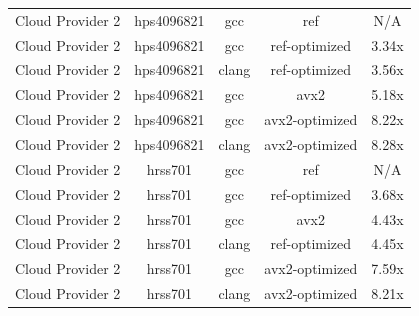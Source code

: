 \begin{table}
\begin{tabularx}{\linewidth}{X c c c c}
            Cloud Provider 2 &           hps4096821 &                  gcc &                  ref &                  N/A\\
            Cloud Provider 2 &           hps4096821 &                  gcc &        ref-optimized &                3.34x\\
            Cloud Provider 2 &           hps4096821 &                clang &        ref-optimized &                3.56x\\
            Cloud Provider 2 &           hps4096821 &                  gcc &                 avx2 &                5.18x\\
            Cloud Provider 2 &           hps4096821 &                  gcc &       avx2-optimized &                8.22x\\
            Cloud Provider 2 &           hps4096821 &                clang &       avx2-optimized &                8.28x\\
            Cloud Provider 2 &              hrss701 &                  gcc &                  ref &                  N/A\\
            Cloud Provider 2 &              hrss701 &                  gcc &        ref-optimized &                3.68x\\
            Cloud Provider 2 &              hrss701 &                  gcc &                 avx2 &                4.43x\\
            Cloud Provider 2 &              hrss701 &                clang &        ref-optimized &                4.45x\\
            Cloud Provider 2 &              hrss701 &                  gcc &       avx2-optimized &                7.59x\\
            Cloud Provider 2 &              hrss701 &                clang &       avx2-optimized &                8.21x\\
        \bottomrule
    \end{tabularx}
\end{table}

